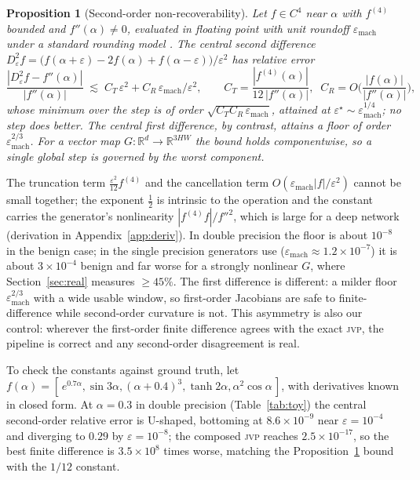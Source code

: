 \documentclass[10pt]{article}
\newtheorem{proposition}{Proposition}
\newcommand{\R}{\mathbb{R}}
\newcommand{\jvp}{\textsc{jvp}}
\newcommand{\eps}{\varepsilon}
\begin{document}
\begin{proposition}[Second-order non-recoverability]
\label{prop:floor}
Let $f\in C^4$ near $\alpha$ with $f^{(4)}$ bounded and $f''(\alpha)\neq0$, evaluated in
floating point with unit roundoff $\eps_{\mathrm{mach}}$ under a standard rounding model
\citep{higham2002}. The central second difference $D^2_\eps f=\big(f(\alpha+\eps)-2f(\alpha)+
f(\alpha-\eps)\big)/\eps^2$ has relative error
\[
\frac{|D^2_\eps f-f''(\alpha)|}{|f''(\alpha)|}
\;\lesssim\; C_T\,\eps^2 + C_R\,\eps_{\mathrm{mach}}/\eps^2,
\qquad C_T=\frac{|f^{(4)}(\alpha)|}{12\,|f''(\alpha)|},\;\;
C_R=O\!\Big(\frac{|f(\alpha)|}{|f''(\alpha)|}\Big),
\]
whose minimum over the step is of order $\sqrt{C_T C_R\,\eps_{\mathrm{mach}}}$, attained at
$\eps^\star\sim\eps_{\mathrm{mach}}^{1/4}$; no step does better. The central first difference, by
contrast, attains a floor of order $\eps_{\mathrm{mach}}^{2/3}$. For a vector map
$G:\R^{d}\to\R^{3HW}$ the bound holds componentwise, so a single global step is governed by the
worst component.
\end{proposition}

The truncation term $\tfrac{\eps^2}{12}f^{(4)}$ and the cancellation term
$O(\eps_{\mathrm{mach}}|f|/\eps^2)$ cannot be small together; the exponent $\tfrac12$ is intrinsic
to the operation and the constant carries the generator's nonlinearity $|f^{(4)}f|/f''^2$, which is
large for a deep network (derivation in Appendix~\ref{app:deriv}). In double precision the floor is
about $10^{-8}$ in the benign case; in the single precision generators use
($\eps_{\mathrm{mach}}\approx1.2\times10^{-7}$) it is about $3\times10^{-4}$ benign and far worse for
a strongly nonlinear $G$, where Section~\ref{sec:real} measures $\geq45\%$. The first difference is
different: a milder floor $\eps_{\mathrm{mach}}^{2/3}$ with a wide usable window, so first-order
Jacobians are safe to finite-difference while second-order curvature is not. This asymmetry is also
our control: wherever the first-order finite difference agrees with the exact \jvp{}, the pipeline is
correct and any second-order disagreement is real.

To check the constants against ground truth, let $f(\alpha)=[\,e^{0.7\alpha},\sin 3\alpha,
(\alpha+0.4)^3,\tanh 2\alpha,\alpha^2\cos\alpha\,]$, with derivatives known in closed form. At
$\alpha=0.3$ in double precision (Table~\ref{tab:toy}) the central second-order relative error is
U-shaped, bottoming at $8.6\times10^{-9}$ near $\eps=10^{-4}$ and diverging to $0.29$ by
$\eps=10^{-8}$; the composed \jvp{} reaches $2.5\times10^{-17}$, so the best finite difference is
$3.5\times10^{8}$ times worse, matching the Proposition~\ref{prop:floor} bound with the $1/12$
constant.
\end{document}
